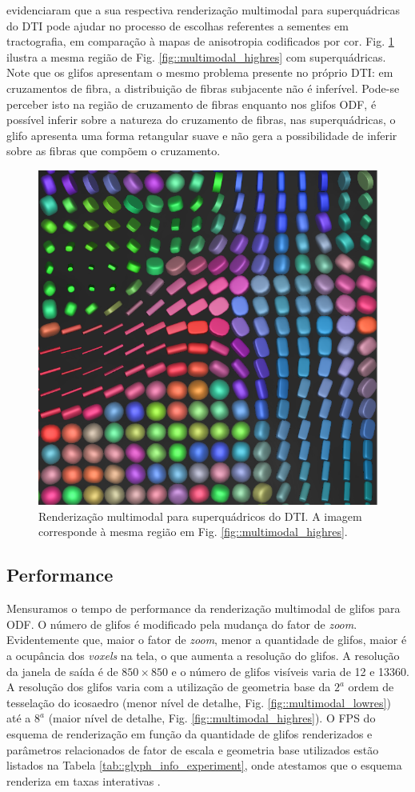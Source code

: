 \documentclass[
    12pt,                %
    oneside,            %
    a4paper,            %
    english,            %
    french,                %
    spanish,            %
    brazil                %
    ]{abntex2}
\begin{document}
 evidenciaram que a sua respectiva renderização multimodal para superquádricas do DTI pode ajudar no processo de escolhas referentes a sementes em tractografia, em comparação à mapas de anisotropia codificados por cor. Fig. \ref{fig::multimodal_superquadric} ilustra a mesma região de Fig. \ref{fig::multimodal_highres} com superquádricas. Note que os glifos apresentam o mesmo problema presente no próprio DTI: em cruzamentos de fibra, a distribuição de fibras subjacente não é inferível. Pode-se perceber isto na região de cruzamento de fibras enquanto nos glifos ODF, é possível inferir sobre a natureza do cruzamento de fibras, nas superquádricas, o glifo apresenta uma forma retangular suave e não gera a possibilidade de inferir sobre as fibras que compõem o cruzamento.


\begin{figure}[ht]
    \centering
    \includegraphics[width=.35\linewidth, angle=0]{figs/Esquema_Glifo/HighResImgSuperquadric.png}
    \caption{ Renderização multimodal para superquádricos do DTI. A imagem corresponde à mesma região em Fig. \ref{fig::multimodal_highres}.}
    \label{fig::multimodal_superquadric}
\end{figure}

\subsection{Performance}
\label{ssec::performance}

Mensuramos o tempo de performance da renderização multimodal de glifos para ODF. O número de glifos é modificado pela mudança do fator de \textit{zoom}. Evidentemente que, maior o fator de \textit{zoom}, menor a quantidade de glifos, maior é a ocupância dos \textit{voxels} na tela, o que aumenta a resolução do glifos. A resolução da janela de saída é de $850\times 850$ e o número de glifos visíveis varia de 12 e 13360. A resolução dos glifos varia com a utilização de geometria base da $2^a$ ordem de tesselação do icosaedro (menor nível de detalhe, Fig. \ref{fig::multimodal_lowres}) até a $8^a$ (maior nível de detalhe, Fig. \ref{fig::multimodal_highres}). O FPS do esquema de renderização em função da quantidade de glifos renderizados e parâmetros relacionados de fator de escala e geometria base utilizados estão listados na Tabela \ref{tab::glyph_info_experiment}, onde atestamos que o esquema renderiza em taxas interativas \cite{nielsen1994}.
\end{document}
